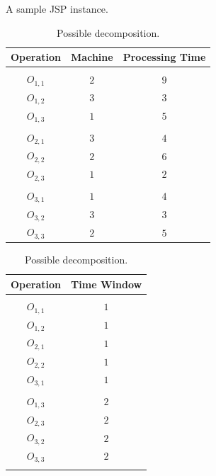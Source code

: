 \documentclass[runningheads]{llncs}
\begin{document}
\begin{table}[t]
\begin{minipage}{.56\textwidth}
\setlength{\tabcolsep}{5.0pt}
\centering
    \caption{A sample JSP instance.}
    \label{tab1}
    \begin{tabular}{c c c}
      \textbf{Operation} & \textbf{Machine} & \textbf{Processing Time} \\
      \hline
								\\
      $O_{1,1}$  & $2$  &  $9$  	\\
      $O_{1,2}$  & $3$  &  $3$  	\\
      $O_{1,3}$  & $1$  &  $5$ 	\\
								\\
      $O_{2,1}$  & $3$  & $4$  	\\
      $O_{2,2}$  & $2$  & $6$  	\\
      $O_{2,3}$  & $1$  & $2$  	\\
								\\
      $O_{3,1}$  & $1$  & $4$  	\\
      $O_{3,2}$  & $3$  & $3$  	\\
      $O_{3,3}$  & $2$  & $5$  	\\
    \end{tabular}
\end{minipage}
\begin{minipage}{.4\textwidth}
  \setlength{\tabcolsep}{5.0pt}
  \centering
    \caption{Possible decomposition.}
    \label{tab2}
    \begin{tabular}{c  c }
      \textbf{Operation} & \textbf{Time Window}  \\
      \hline
							\\
      $O_{1,1}$  & $1$    	\\
      $O_{1,2}$  & $1$    	\\
      $O_{2,1}$  & $1$    	\\
      $O_{2,2}$  & $1$   	\\
      $O_{3,1}$  & $1$		\\
					    		\\
      $O_{1,3}$  & $2$  	\\
      $O_{2,3}$  & $2$		\\
      $O_{3,2}$  & $2$    	\\
      $O_{3,3}$  & $2$    	\\
      \\
    \end{tabular}
\end{minipage}
\end{table}
\end{document}
